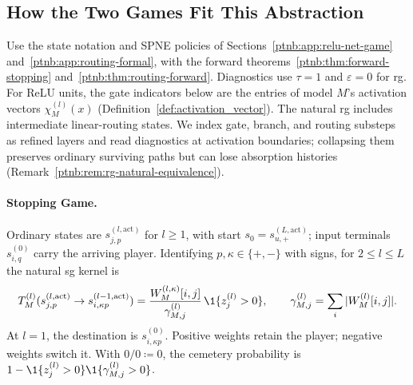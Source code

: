 \subsection{How the Two Games Fit This Abstraction}\label{ptnb:sec:games-fit}

Use the state notation and SPNE policies of Sections~\ref{ptnb:app:relu-net-game} and~\ref{ptnb:app:routing-formal}, with the forward theorems~\ref{ptnb:thm:forward-stopping} and~\ref{ptnb:thm:routing-forward}. Diagnostics use $\tau=1$ and $\varepsilon=0$ for \ac{rg}. For ReLU units, the gate indicators below are the entries of model $M$'s activation vectors $\chi_M^{(l)}(x)$ (Definition~\ref{def:activation_vector}). The natural \ac{rg} includes intermediate linear-routing states. We index gate, branch, and routing substeps as refined layers and read diagnostics at activation boundaries; collapsing them preserves ordinary surviving paths but can lose absorption histories (Remark~\ref{ptnb:rem:rg-natural-equivalence}).

\paragraph{Stopping Game.}
Ordinary states are $s^{(l,\mathrm{act})}_{j,p}$ for $l\ge1$, with start $s_0=s^{(L,\mathrm{act})}_{u,+}$; input terminals $s^{(0)}_{i,q}$ carry the arriving player. Identifying $p,\kappa\in\{+,-\}$ with signs, for $2\le l\le L$ the natural \ac{sg} kernel is
\begin{equation}\label{ptnb:eq:adf-T}
 T_M^{(l)}(s^{(l,\mathrm{act})}_{j,p}\to s^{(l-1,\mathrm{act})}_{i,\kappa p})
 =\frac{W_M^{(l,\kappa)}[i,j]}{\gamma^{(l)}_{M,j}}\,\1\{z_j^{(l)}>0\},
 \qquad \gamma^{(l)}_{M,j}=\sum_i|W_M^{(l)}[i,j]|.
\end{equation}
At $l=1$, the destination is $s^{(0)}_{i,\kappa p}$. Positive weights retain the player; negative weights switch it. With $0/0\coloneqq0$, the cemetery probability is $1-\1\{z_j^{(l)}>0\}\1\{\gamma^{(l)}_{M,j}>0\}$.

